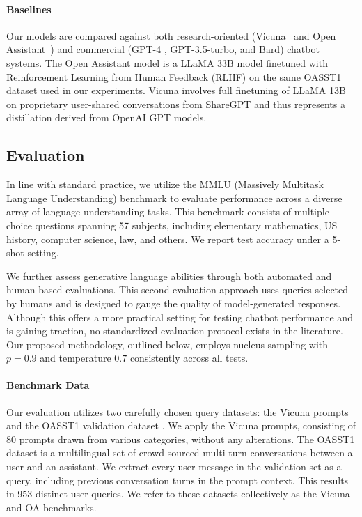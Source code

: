 \paragraph{Baselines} Our models are compared against both research-oriented (Vicuna~\citep{vicuna2023} and Open Assistant~\citep{kopf2023openassistant}) and commercial (GPT-4 \citep{openai2023gpt}, GPT-3.5-turbo, and Bard) chatbot systems. The Open Assistant model is a LLaMA 33B model finetuned with Reinforcement Learning from Human Feedback (RLHF) on the same OASST1 dataset used in our experiments. Vicuna involves full finetuning of LLaMA 13B on proprietary user-shared conversations from ShareGPT and thus represents a distillation derived from OpenAI GPT models.

\subsection{Evaluation}

In line with standard practice, we utilize the MMLU (Massively Multitask Language Understanding) benchmark \citep{hendrycksmeasuring} to evaluate performance across a diverse array of language understanding tasks. This benchmark consists of multiple-choice questions spanning 57 subjects, including elementary mathematics, US history, computer science, law, and others. We report test accuracy under a 5-shot setting.

We further assess generative language abilities through both automated and human-based evaluations. This second evaluation approach uses queries selected by humans and is designed to gauge the quality of model-generated responses. Although this offers a more practical setting for testing chatbot performance and is gaining traction, no standardized evaluation protocol exists in the literature. Our proposed methodology, outlined below, employs nucleus sampling with $p=0.9$ and temperature $0.7$ consistently across all tests.

\paragraph{Benchmark Data} Our evaluation utilizes two carefully chosen query datasets: the Vicuna prompts \citep{vicuna2023} and the OASST1 validation dataset \citep{kopf2023openassistant}. We apply the Vicuna prompts, consisting of 80 prompts drawn from various categories, without any alterations. The OASST1 dataset is a multilingual set of crowd-sourced multi-turn conversations between a user and an assistant. We extract every user message in the validation set as a query, including previous conversation turns in the prompt context. This results in 953 distinct user queries. We refer to these datasets collectively as the Vicuna and OA benchmarks.


